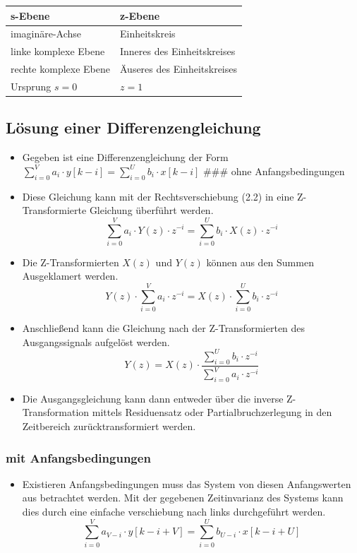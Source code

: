 \documentclass[11pt]{article}
\providecommand{\tightlist}{%
      \setlength{\itemsep}{0pt}\setlength{\parskip}{0pt}}
\begin{document}
\begin{longtable}[]{@{}ll@{}}
\toprule
s-Ebene & z-Ebene\tabularnewline
\midrule
\endhead
imaginäre-Achse & Einheitskreis\tabularnewline
linke komplexe Ebene & Inneres des Einheitskreises\tabularnewline
rechte komplexe Ebene & Äuseres des Einheitskreises\tabularnewline
Ursprung \(s = 0\) & \(z = 1\)\tabularnewline
\bottomrule
\end{longtable}

    \subsection{Lösung einer
Differenzengleichung}\label{luxf6sung-einer-differenzengleichung}

\begin{itemize}
\tightlist
\item
  Gegeben ist eine Differenzengleichung der Form
  \(\sum_{i=0}^V a_i \cdot y[k-i] = \sum_{i=0}^U b_i \cdot x[k-i]\)
  \#\#\# ohne Anfangsbedingungen
\item
  Diese Gleichung kann mit der Rechtsverschiebung (2.2) in eine
  Z-Transformierte Gleichung überführt werden.
  \[\sum_{i=0}^V a_i \cdot Y(z) \cdot z^{-i} = \sum_{i=0}^U b_i \cdot X(z) \cdot z^{-i}\]
\item
  Die Z-Transformierten \(X(z)\) und \(Y(z)\) können aus den Summen
  Ausgeklamert werden.
  \[Y(z) \cdot \sum_{i=0}^V a_i \cdot z^{-i} = X(z) \cdot \sum_{i=0}^U b_i \cdot z^{-i}\]
\item
  Anschließend kann die Gleichung nach der Z-Transformierten des
  Ausgangssignals aufgelöst werden.
  \[Y(z) = X(z) \cdot \frac{\sum_{i=0}^U b_i \cdot z^{-i}}{\sum_{i=0}^V a_i \cdot z^{-i}}\]
\item
  Die Ausgangsgleichung kann dann entweder über die inverse
  Z-Transformation mittels Residuensatz oder Partialbruchzerlegung in
  den Zeitbereich zurücktransformiert werden.
\end{itemize}

    \subsubsection{mit Anfangsbedingungen}\label{mit-anfangsbedingungen}

\begin{itemize}
\tightlist
\item
  Existieren Anfangsbedingungen muss das System von diesen Anfangswerten
  aus betrachtet werden. Mit der gegebenen Zeitinvarianz des Systems
  kann dies durch eine einfache verschiebung nach links durchgeführt
  werden. \[ 
  \sum_{i = 0}^V a_{V-i} \cdot y[k-i+V]
  =
  \sum_{i = 0}^U b_{U-i} \cdot x[k-i+U]
  \]
\end{itemize}
\end{document}
